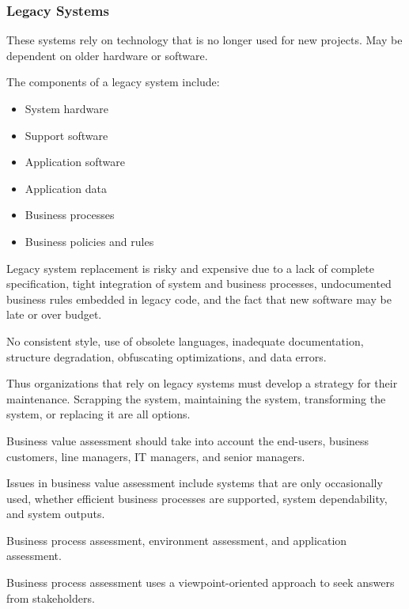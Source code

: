 \documentclass[12pt]{article}
\begin{document}
\subsubsection*{Legacy Systems}

These systems rely on technology that is no longer used for new projects. May
be dependent on older hardware or software.

The components of a legacy system include:

\begin{itemize}
    \item System hardware
    \item Support software
    \item Application software
    \item Application data
    \item Business processes
    \item Business policies and rules
\end{itemize}

Legacy system replacement is risky and expensive due to a lack of complete
specification, tight integration of system and business processes, undocumented
business rules embedded in legacy code, and the fact that new software may be
late or over budget.

No consistent style, use of obsolete languages, inadequate documentation,
structure degradation, obfuscating optimizations, and data errors.

Thus organizations that rely on legacy systems must develop a strategy for
their maintenance. Scrapping the system, maintaining the system, transforming
the system, or replacing it are all options.

Business value assessment should take into account the end-users, business
customers, line managers, IT managers, and senior managers.

Issues in business value assessment include systems that are only occasionally
used, whether efficient business processes are supported, system dependability,
and system outputs.

Business process assessment, environment assessment, and application
assessment.

Business process assessment uses a viewpoint-oriented approach to seek answers
from stakeholders.
\end{document}
